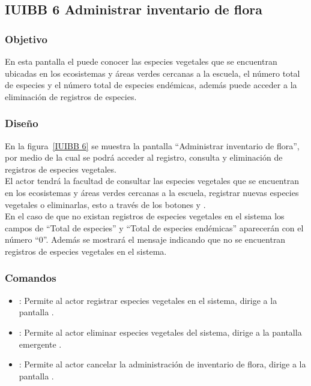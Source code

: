 \subsection{IUIBB 6 Administrar inventario de flora}

\subsubsection{Objetivo}

    En esta pantalla el  puede conocer las especies vegetales que se encuentran ubicadas en los ecosistemas y áreas verdes cercanas a la escuela, el número total de especies y el número total de especies endémicas, además puede acceder a la eliminación de registros de especies.

\subsubsection{Diseño}

    En la figura~\ref{IUIBB 6} se muestra la pantalla ``Administrar inventario de flora'', por medio de la cual se podrá acceder al registro, consulta y eliminación de registros de especies vegetales.\\
    
    El actor tendrá la facultad de consultar las especies vegetales que se encuentran en los ecosistemas y áreas verdes cercanas a la escuela, registrar nuevas especies vegetales o eliminarlas, esto a través de los botones  y \botKo.\\
    
    En el caso de que no existan registros de especies vegetales en el sistema los campos de ``Total de especies'' y ``Total de especies endémicas'' aparecerán con el número ``0''. Además se mostrará el mensaje  indicando que no se encuentran registros de especies vegetales en el sistema.



\subsubsection{Comandos}
    \begin{itemize}
	\item {}: Permite al actor registrar especies vegetales en el sistema, dirige a la pantalla .
	
	\item \botKo[Eliminar]: Permite al actor eliminar especies vegetales del sistema, dirige a la pantalla emergente .
	
	\item {}: Permite al actor cancelar la administración de inventario de flora, dirige a la pantalla .
    \end{itemize}

